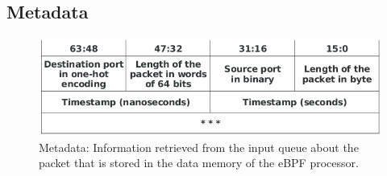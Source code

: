 \subsection{Metadata}
\label{sec:metadata}

\begin{figure}[ht]
\centering
\includegraphics[width=1.\linewidth]{figures/06_fig03.png}
\caption{Metadata: Information retrieved from the input queue about the packet that is stored in the data memory of the eBPF processor.}
\label{fig:06_fig03}
\end{figure}



